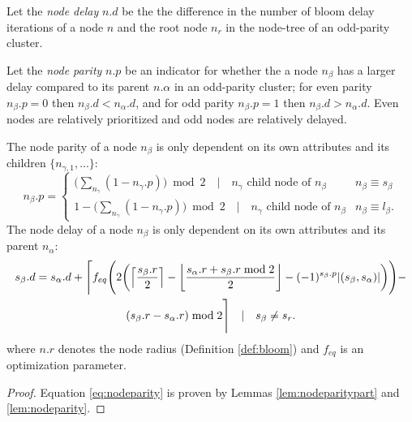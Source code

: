 \begin{definition}\label{def:nodedelay}
  Let the \emph{node delay} $n.d$ be the the difference in the number of bloom delay iterations of a node $n$ and the root node $n_r$ in the node-tree of an odd-parity cluster.
\end{definition}

\begin{definition}\label{def:nodeparity}
  Let the \emph{node parity} $n.p$ be an indicator for whether the a node $n_\beta$ has a larger delay compared to its parent $n.\alpha$ in an odd-parity cluster; for even parity $n_\beta.p=0$ then $n_\beta.d < n_\alpha.d$, and for odd parity $n_\beta.p=1$ then $n_\beta.d > n_\alpha.d$. Even nodes are relatively prioritized and odd nodes are relatively delayed.
\end{definition}

\begin{theorem}\label{the:delayequation}
  The node parity of a node $n_\beta$ is only dependent on its own attributes and its children $\{n_{\gamma,1}, ...\}$:
  \begin{equation}\label{eq:nodeparity}
    n_\beta.p =
    \begin{cases}
      \big( \sum_{n_\gamma} (1-n_\gamma.p) \big ) \bmod 2 \hspace{1em} | \hspace{1em} n_\gamma \text{ child node of } n_\beta & n_\beta \equiv s_\beta \\
      1 - \big( \sum_{n_\gamma} (1-n_\gamma.p) \big ) \bmod 2 \hspace{1em} | \hspace{1em} n_\gamma \text{ child node of } n_\beta & n_\beta \equiv l_\beta.
    \end{cases} 
  \end{equation}
  The node delay of a node $n_\beta$ is only dependent on its own attributes and its parent $n_\alpha$:
  \begin{multline}\label{eq:delayequation}
    s_\beta.d = s_\alpha.d + \Bigg \lceil f_{eq} \Bigg( 2\bigg({\left \lceil \frac{s_\beta.r}{2} \right \rceil } - {\left \lfloor \frac{s_\alpha.r + s_\beta.r \bmod 2}{2} \right \rfloor } - (-1)^{s_\beta.p}\abs{(s_\beta,s_\alpha)}\bigg)
    \Bigg) - \\
    (s_\beta.r - s_\alpha.r) \bmod 2 \Bigg \rceil \hspace{1em} | \hspace{1em} s_\beta \neq s_r.
  \end{multline}
  where $n.r$ denotes the node radius (Definition \ref{def:bloom}) and $f_{eq}$ is an optimization parameter.
\end{theorem}
\begin{proof}
  Equation \ref{eq:nodeparity} is proven by Lemmas \ref{lem:nodeparitypart} and \ref{lem:nodeparity}. 
\end{proof}

